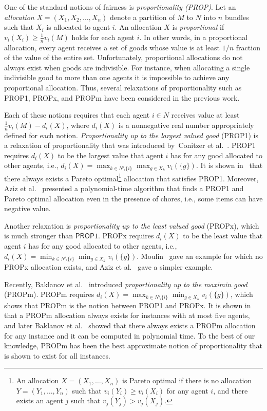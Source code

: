 \documentclass[11pt]{article}
\newcommand{\PROPm}{\textsf{PROPm}\xspace}
\newcommand{\PROPx}{\textsf{PROPx}\xspace}
\newcommand{\PROP}{\textsf{PROP}\xspace}
\begin{document}
One of the standard notions of fairness is {\it proportionality (\PROP)}.
Let an {\it allocation} $X=(X_1,X_2,\ldots, X_n)$ denote a partition of $M$ to $N$ into $n$ bundles such that $X_i$ is allocated to agent $i$.
An allocation $X$ is {\it proportional} if $v_i(X_i)\ge \frac{1}{n}v_i(M)$ holds for each agent $i$.
In other words, in a proportional allocation, every agent receives a set of goods whose value is at least $1/n$ fraction of the value of the entire set. 
Unfortunately, proportional allocations do not always exist when goods are indivisible.
For instance, when allocating a single indivisible good to more than one agents it is impossible to achieve any proportional allocation.
Thus, several relaxations of proportionality such as {\PROP}1, \PROPx, and \PROPm have been considered in the previous work.

Each of these notions requires that each agent $i\in N$ receives value at least $\frac{1}{n}v_i(M)-d_i(X)$, where $d_i(X)$ is a nonnegative real number appropriately defined for each notion.
{\it Proportionality up to the largest valued good} ({\PROP}1) is a relaxation of proportionality that was introduced by~Conitzer et al.~\cite{conitzer2017fair}.
{\PROP}1 requires $d_i(X)$ to be the largest value that agent $i$ has for any good allocated to other agents, i.e., $d_i(X)=\max_{k\in N\setminus \{i\}} \max_{g\in X_k} v_i(\{g\})$.
It is shown in~\cite{conitzer2017fair} that there always exists a Pareto optimal\footnote{An allocation $X=(X_1,\ldots, X_n)$ is Pareto optimal if there is no allocation $Y=(Y_1,\ldots, Y_n)$ such that $v_i(Y_i) \ge v_i(X_i)$ for any agent $i$, and there exists an agent $j$ such that $v_j(Y_j) > v_j(X_j)$.} allocation that satisfies {\PROP}1.
Moreover, Aziz et al.~\cite{aziz2020polynomial} presented a polynomial-time algorithm that finds a {\PROP}1 and Pareto optimal allocation even in the presence of chores, i.e., some items can have negative value.

Another relaxation is {\it proportionality up to the least valued good} (\PROPx), which is much stronger than ${\PROP}1$. 
\PROPx requires $d_i(X)$ to be the least value that agent $i$ has for any good allocated to other agents, i.e., $d_i(X)=\min_{k\in N\setminus \{i\}} \min_{g\in X_k} v_i(\{g\})$. 
Moulin~\cite{moulin2019fair} gave an example for which no \PROPx allocation exists, and Aziz et al.~\cite{aziz2020polynomial} gave a simpler example. 

Recently, Baklanov et al.~\cite{baklanov2021achieving} introduced {\it proportionality up to the maximin good} (\PROPm). 
\PROPm requires $d_i(X)=\max_{k\in N\setminus \{i\}} \min_{g\in X_k} v_i(\{g\})$, 
which shows that \PROPm is the notion between {\PROP}1 and \PROPx. 
It is shown in~\cite{baklanov2021achieving} that a \PROPm allocation always exists for instances with at most five agents, and later 
Baklanov et al.~\cite{ijcai2021-4} showed that there always exists a \PROPm allocation for any instance and it can be computed in polynomial time. 
To the best of our knowledge, \PROPm has been the best approximate notion of proportionality that is shown to exist for all instances. 
\end{document}
